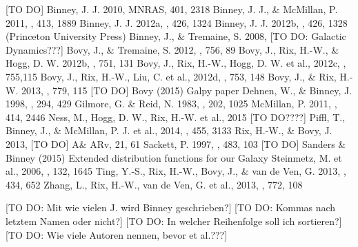 \documentclass[12pt,preprint]{aastex}
\begin{document}
\begin{thebibliography}{}
 [TO DO]
 Binney, J. J. 2010, MNRAS, 401, 2318
 Binney, J. J., \& McMillan, P. 2011, \mnras, 413, 1889
 Binney, J. J. 2012a, \mnras, 426, 1324
 Binney, J. J. 2012b, \mnras, 426, 1328 (Princeton University Press)
 Binney, J., \& Tremaine, S. 2008, [TO DO: Galactic Dynamics???]
 Bovy, J., \& Tremaine, S. 2012, \apj, 756, 89
 Bovy, J., Rix, H.-W., \& Hogg, D. W. 2012b, \apj, 751, 131
 Bovy, J., Rix, H.-W., Hogg, D. W. et al., 2012c, \apj, 755,115
 Bovy, J., Rix, H.-W., Liu, C. et al., 2012d, \apj, 753, 148
  Bovy, J., \& Rix, H.-W. 2013, \apj, 779, 115
 [TO DO] Bovy (2015) Galpy paper
 Dehnen, W., \& Binney, J. 1998, \mnras, 294, 429
 Gilmore, G. \& Reid, N. 1983, \mnras, 202, 1025
 McMillan, P. 2011, \mnras, 414, 2446
 Ness, M., Hogg, D. W., Rix, H.-W. et al., 2015 [TO DO????]
 Piffl, T., Binney, J., \& McMillan, P. J. et al., 2014, \mnras, 455, 3133
 Rix, H.-W., \& Bovy, J. 2013, [TO DO] A\& ARv, 21, 61
 Sackett, P. 1997, \apj, 483, 103
 [TO DO] Sanders \& Binney (2015) Extended distribution functions for our Galaxy
 Steinmetz, M. et al., 2006, \aj, 132, 1645
 Ting, Y.-S., Rix, H.-W., Bovy, J., \& van de Ven, G. 2013, \mnras, 434, 652
 Zhang, L., Rix, H.-W., van de Ven, G. et al., 2013, \apj, 772, 108
\end{thebibliography}

[TO DO: Mit wie vielen J. wird Binney geschrieben?] [TO DO: Kommas nach letztem Namen oder nicht?] [TO DO: In welcher Reihenfolge soll ich sortieren?] [TO DO: Wie viele Autoren nennen, bevor et al.???]
\end{document}
